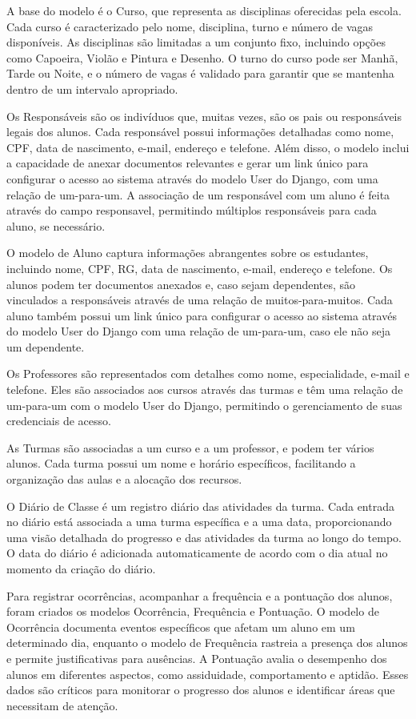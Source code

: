 A base do modelo é o Curso, que representa as disciplinas oferecidas pela escola. Cada curso é caracterizado pelo nome, disciplina, turno e número de vagas disponíveis. As disciplinas são limitadas a um conjunto fixo, incluindo opções como Capoeira, Violão e Pintura e Desenho. O turno do curso pode ser Manhã, Tarde ou Noite, e o número de vagas é validado para garantir que se mantenha dentro de um intervalo apropriado.

Os Responsáveis são os indivíduos que, muitas vezes, são os pais ou responsáveis legais dos alunos. Cada responsável possui informações detalhadas como nome, CPF, data de nascimento, e-mail, endereço e telefone. Além disso, o modelo inclui a capacidade de anexar documentos relevantes e gerar um link único para configurar o acesso ao sistema através do modelo User do Django, com uma relação de um-para-um. A associação de um responsável com um aluno é feita através do campo responsavel, permitindo múltiplos responsáveis para cada aluno, se necessário.

O modelo de Aluno captura informações abrangentes sobre os estudantes, incluindo nome, CPF, RG, data de nascimento, e-mail, endereço e telefone. Os alunos podem ter documentos anexados e, caso sejam dependentes, são vinculados a responsáveis através de uma relação de muitos-para-muitos. Cada aluno também possui um link único para configurar o acesso ao sistema através do modelo User do Django com uma relação de um-para-um, caso ele não seja um dependente.

Os Professores são representados com detalhes como nome, especialidade, e-mail e telefone. Eles são associados aos cursos através das turmas e têm uma relação de um-para-um com o modelo User do Django, permitindo o gerenciamento de suas credenciais de acesso.

As Turmas são associadas a um curso e a um professor, e podem ter vários alunos. Cada turma possui um nome e horário específicos, facilitando a organização das aulas e a alocação dos recursos.

O Diário de Classe é um registro diário das atividades da turma. Cada entrada no diário está associada a uma turma específica e a uma data, proporcionando uma visão detalhada do progresso e das atividades da turma ao longo do tempo. O data do diário é adicionada automaticamente de acordo com o dia atual no momento da criação do diário.

Para registrar ocorrências, acompanhar a frequência e a pontuação dos alunos, foram criados os modelos Ocorrência, Frequência e Pontuação. O modelo de Ocorrência documenta eventos específicos que afetam um aluno em um determinado dia, enquanto o modelo de Frequência rastreia a presença dos alunos e permite justificativas para ausências. A Pontuação avalia o desempenho dos alunos em diferentes aspectos, como assiduidade, comportamento e aptidão. Esses dados são críticos para monitorar o progresso dos alunos e identificar áreas que necessitam de atenção.

